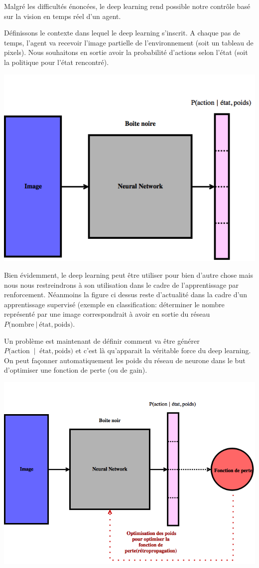 Malgré les difficultés énoncées, le deep learning rend possible notre contrôle basé sur la vision en temps réel d'un agent. 

Définissons le contexte dans lequel le deep learning s'inscrit. A chaque pas de temps, l'agent va recevoir l'image partielle de l'environnement (soit un tableau de pixels). Nous souhaitons en sortie avoir la probabilité d'actions selon l'état (soit la politique pour l'état rencontré).

\begin{center}

\includegraphics[width=.4\linewidth]{./assets/DeepLearning/dl}
\end{center}

Bien évidemment, le deep learning peut être utiliser pour bien d'autre chose mais nous nous restreindrons à son utilisation dans le cadre de l'apprentissage par renforcement. Néanmoins la figure ci dessus reste d'actualité dans la cadre d'un apprentissage supervisé (exemple en classification: déterminer le nombre représenté par une image correspondrait à avoir en sortie du réseau $P(\text{nombre} \:\vert\: \text{état}, \text{poids)}$. 

Un problème est maintenant de définir comment va être générer  $P(\text{action } \:\vert\: \text{ état}, \text{poids)}$ et c'est là qu'apparait la véritable force du deep learning. On peut façonner automatiquement les poids du réseau de neurone dans le but d'optimiser une fonction de perte (ou de gain).

\begin{center}
\includegraphics[width=.55\linewidth]{./assets/DeepLearning/dl2}
\end{center}

